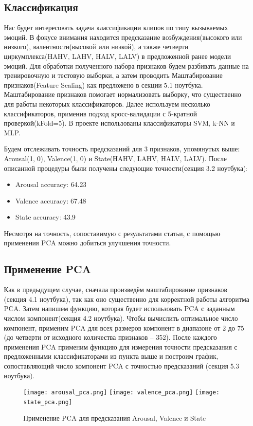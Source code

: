 \documentclass{article}
\begin{document}
\subsection{Классификация}
Нас будет интересовать задача классификации клипов по типу вызываемых эмоций. В фокусе внимания находится предсказание возбуждения(высокого или низкого), валентности(высокой или низкой), а также четверти циркумплекса(HAHV, LAHV, HALV, LALV) в предложенной ранее модели эмоций.
Для обработки полученного набора признаков будем разбивать данные на тренировочную и тестовую выборки, а затем проводить Маштабирование признаков(Feature Scaling) как предложено в секции 5.1 ноутбука. Маштабирование признаков помогает нормализовать выборку, что существенно для работы некоторых классификаторов. Далее используем несколько классификаторов, применив подход кросс-валидации с 5-кратной проверкой(kFold=5). В проекте использованы классификаторы SVM, k-NN и MLP.

Будем отслеживать точность предсказаний для 3 признаков, упомянутых выше: Arousal(1, 0), Valence(1, 0) и State(HAHV, LAHV, HALV, LALV).
После описанной процедуры были получены следующие точности(секция 3.2 ноутбука):
\begin{itemize}
\item Arousal accuracy: 64.23
\item Valence accuracy: 67.48
\item State accuracy: 43.9
\end{itemize}
Несмотря на точность, сопоставимую с результатами статьи\cite{Atkinson}, с помощью применения PCA можно добиться улучшения точности.

\subsection{Применение PCA}
Как в предыдущем случае, сначала произведём маштабирование признаков (секция 4.1 ноутбука), так как оно существенно для корректной работы алгоритма PCA. Затем напишем функцию, которая будет использовать PCA с заданным числом компонент(секция 4.2 ноутбука).
Чтобы вычислить оптимальное число компонент, применим PCA для всех размеров компонент в диапазоне от 2 до 75 (до четверти от исходного количества признаков -- 352).
После каждого применения PCA применим функцию для измерения точности предсказания с предложенными классификаторами из пункта выше и построим график, сопоставляющий число компонент PCA с точностью предсказаний (секция 5.3 ноутбука).

\begin{figure}[h!]
    \texttt{[image: arousal\_pca.png]}\hfill
    \texttt{[image: valence\_pca.png]}\hfill
    \texttt{[image: state\_pca.png]}
    \caption{Применение PCA для предсказания Arousal, Valence и State}
\end{figure}
    
\end{document}
